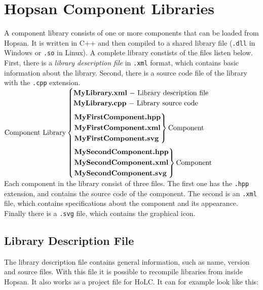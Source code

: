 \documentclass[a4paper,pdftex]{article}
\begin{document}
\section*{Hopsan Component Libraries}
A component library consists of one or more components that can be loaded from Hopsan. It is written in C++ and then compiled to a shared library file (\texttt{.dll} in Windows or \texttt{.so} in Linux). A complete library constists of the files listen below. First, there is a \textit{library description file} in \texttt{.xml} format, which contains basic information about the library. Second, there is a source code file of the library with the \texttt{.cpp} extension.\vspace{10pt}\\
$\mathrm{Component\ Library} \begin{cases}
\mathtt{\textbf{MyLibrary.xml}} \mathrm{\ -\ Library\ description\ file}\\
\mathtt{\textbf{MyLibrary.cpp}} \mathrm{\ -\ Library\ source\ code}\vspace{7pt} \\ 
\begin{rcases}
  \mathtt{\textbf{MyFirstComponent.hpp}} \\
  \mathtt{\textbf{MyFirstComponent.xml}} \\
  \mathtt{\textbf{MyFirstComponent.svg}}
\end{rcases} \mathrm{Component}\vspace{7pt} \\
\begin{rcases}
  \mathtt{\textbf{MySecondComponent.hpp}} \\
  \mathtt{\textbf{MySecondComponent.xml}} \\
  \mathtt{\textbf{MySecondComponent.svg}}
\end{rcases} \mathrm{Component} \\
\end{cases}$
\vspace{10pt}\\
Each component in the library consist of three files. The first one has the \texttt{.hpp} extension, and contains the source code of the component. The second is an \texttt{.xml} file, which contains specifications about the component and its appearance. Finally there is a \texttt{.svg} file, which contains the graphical icon.

\subsection*{Library Description File}
The library description file contains general information, such as name, version and source files.
With this file it is possible to recompile libraries from inside Hopsan.
It also works as a project file for HoLC.
It can for example look like this:
\end{document}
